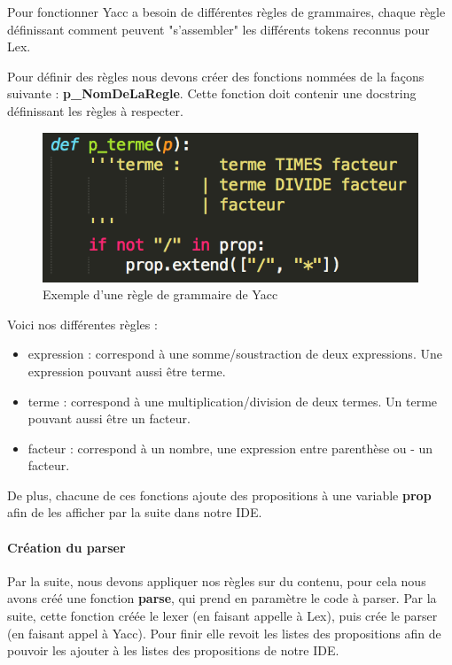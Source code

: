 \documentclass[a4paper,12pt]{article}
\begin{document}
				Pour fonctionner Yacc a besoin de différentes règles de grammaires, chaque règle définissant comment peuvent "s'assembler" les différents tokens reconnus pour Lex.

				Pour définir des règles nous devons créer des fonctions nommées de la façons suivante : \textbf{p\_NomDeLaRegle}. Cette fonction doit contenir une docstring définissant les règles à respecter.

				\begin{figure}[h!]
					\begin{center}
						\includegraphics[scale=1]{images/exp_grammaire_yacc}
						\caption{Exemple d'une règle de grammaire de Yacc}
					\end{center}
				\end{figure}

				Voici nos différentes règles : 
				\begin{itemize}
					\item expression : correspond à une somme/soustraction de deux expressions. Une expression pouvant aussi être terme.
					\item terme : correspond à une multiplication/division de deux termes. Un terme pouvant aussi être un facteur.
					\item facteur : correspond à un nombre, une expression entre parenthèse ou - un facteur.
				\end{itemize}

				De plus, chacune de ces fonctions ajoute des propositions à une variable \textbf{prop} afin de les afficher par la suite dans notre IDE.

			\paragraph{Création du parser}

				Par la suite, nous devons appliquer nos règles sur du contenu, pour cela nous avons créé une fonction \textbf{parse}, qui prend en paramètre le code à parser. Par la suite, cette fonction créée le lexer (en faisant appelle à Lex), puis crée le parser (en faisant appel à Yacc). Pour finir elle revoit les listes des propositions afin de pouvoir les ajouter à les listes des propositions de notre IDE.
	
\end{document}
